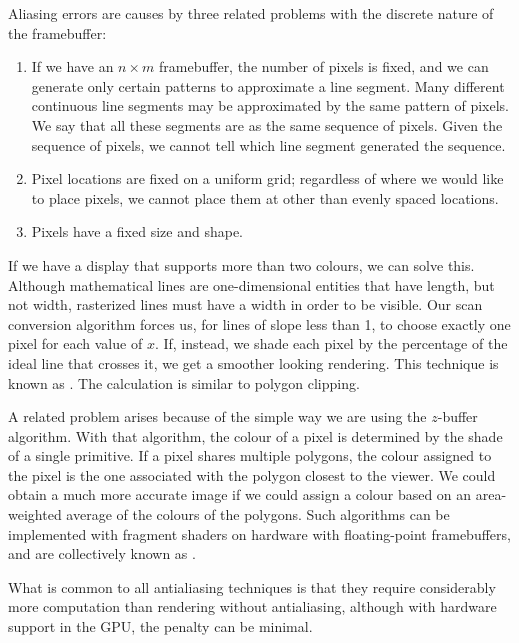 \documentclass[../COS3712_Notes.tex]{subfiles}
\begin{document}
      Aliasing errors are causes by three related problems with the discrete nature
      of the framebuffer:
      \begin{enumerate}[nosep]
        \item If we have an $n \times m$ framebuffer, the number of pixels is fixed,
          and we can generate only certain patterns to approximate a line segment.
          Many different continuous line segments may be approximated by the same pattern
          of pixels.
          We say that all these segments are  as the same sequence of pixels.
          Given the sequence of pixels, we cannot tell which line segment generated the sequence.
        \item Pixel locations are fixed on a uniform grid; regardless of where we would like
          to place pixels, we cannot place them at other than evenly spaced locations.
        \item Pixels have a fixed size and shape.
      \end{enumerate}

      If we have a display that supports more than two colours, we can solve this.
      Although mathematical lines are one-dimensional entities that have length, but not width,
      rasterized lines must have a width in order to be visible.
      Our scan conversion algorithm forces us, for lines of slope less than 1,
      to choose exactly one pixel for each value of $x$.
      If, instead, we shade each pixel by the percentage of the ideal line that crosses it,
      we get a smoother looking rendering.
      This technique is known as .
      The calculation is similar to polygon clipping.

      A related problem arises because of the simple way we are using the $z$-buffer algorithm.
      With that algorithm, the colour of a pixel is determined by the shade of a single primitive.
      If a pixel shares multiple polygons, the colour assigned to the pixel is the one
      associated with the polygon closest to the viewer.
      We could obtain a much more accurate image if we could assign a colour based on an
      area-weighted average of the colours of the polygons.
      Such algorithms can be implemented with fragment shaders on hardware with
      floating-point framebuffers,
      and are collectively known as .

      What is common to all antialiasing techniques is that they require considerably
      more computation than rendering without antialiasing, although with hardware support
      in the GPU, the penalty can be minimal.

\end{document}
